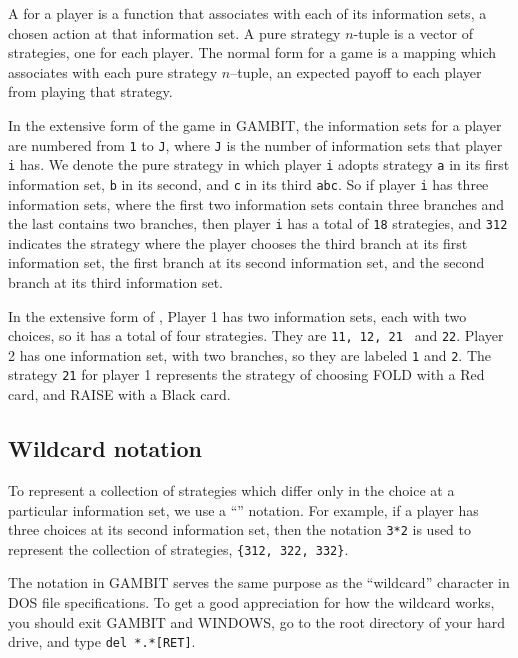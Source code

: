 A  for a player is a function that 
associates with each of 
its information sets, a chosen action at that information set.  A pure 
strategy $n$-tuple is a vector of strategies, one for each player.  
The normal form for a game is a mapping which associates with each pure 
strategy $n$--tuple, an expected payoff to each player from 
playing that strategy. 

In the extensive form of the game in GAMBIT, the information sets for a 
player are numbered from \verb+1+ to \verb+J+, where \verb+J+ is the number of information 
sets that player \verb+i+ has.  We denote the pure strategy in which player \verb+i+ 
adopts strategy \verb+a+ in its first information set, \verb+b+ in its second, and 
\verb+c+ in its third \verb+abc+.  So if player \verb+i+ has three information sets, where 
the first two information sets contain three branches and the last contains 
two branches, then player \verb+i+ has a total of \verb+18+ strategies, 
and \verb+312+ indicates the strategy where the player chooses the third 
branch at its first information set, the first branch at its second 
information set, and the second branch at its third information set.  

In the extensive form of , 
Player 1 has two information sets, each with two choices, so it has a total of four 
strategies.  They are {\tt 11, 12, 21 } and {\tt 22}.  Player 2 has one 
information set, with two branches, so they are labeled {\tt 1} and {\tt 2}.  
The strategy {\tt 21} for player 1 represents the strategy of
choosing FOLD with a Red card, and RAISE with a Black card.  
 
\subsection{Wildcard notation}
To represent a collection of strategies which differ only in the choice at
a particular information set, we use a ``'' 
notation.  For example,
if a player has three choices at its second information set, then the 
notation {\tt 3*2} is used to represent the collection of strategies, 
{\tt \{312, 322, 332\}}.  

The {\tt *} notation in GAMBIT serves the same purpose as the ``wildcard'' 
character in DOS file specifications.  To get a good appreciation for how 
the wildcard works, you should exit GAMBIT and WINDOWS, go to the root 
directory of your hard drive, and type \verb+del *.*[RET]+.

